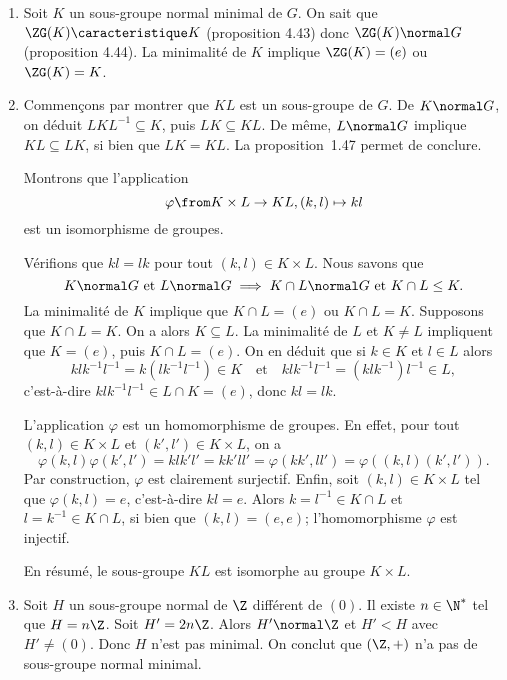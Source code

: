 \begin{enumerate}
  \item
    Soit $K$ un sous-groupe normal minimal de $G$. On sait que
    $\ZG(K)\caracteristique K$ (proposition 4.43) donc $\ZG(K)\normal G$
    (proposition 4.44).  La minimalité de $K$ implique $\ZG(K) = (e)$ ou
    $\ZG(K) = K$.

  \item
    Commençons par montrer que $KL$ est un sous-groupe de $G$.
    De $K\normal G$, on déduit $LKL^{-1}\subseteq K$, puis $LK\subseteq KL$.
    De même, $L\normal G$ implique $KL\subseteq LK$, si bien que $LK = KL$.
    La proposition~1.47 permet de conclure.

    Montrons que l'application
    \[
      \varphi\from K\times L\to KL,
      (k,l) \mapsto kl
    \]
    est un isomorphisme de groupes.

    Vérifions que $kl = lk$ pour tout $(k,l)\in K\times L$. Nous savons
    que
    \[
      K\normal G\text{ et } L\normal G
      \implies K\cap L\normal G\text{ et } K\cap L\leq K.
    \]
    La minimalité de $K$ implique que $K\cap L = (e)$ ou $K\cap L = K$.
    Supposons que $K\cap L = K$. On a alors $K\subseteq  L$.  La minimalité de
    $L$ et $K\neq L$ impliquent que $K = (e)$, puis $K\cap L = (e)$.  On en
    déduit que si $k\in K$ et $l\in L$ alors
    \[
      klk^{-1}l^{-1} = k(lk^{-1}l^{-1})\in K
      \quad\text{et}\quad
      klk^{-1}l^{-1} = (klk^{-1})l^{-1}\in L,
    \]
    c'est-à-dire $klk^{-1}l^{-1}\in L\cap K = (e)$, donc $kl = lk$.

    L'application $\varphi$ est un homomorphisme de groupes. En effet, pour
    tout $(k,l)\in K\times L$ et $(k',l')\in K\times L$, on a
    \[
      \varphi(k,l)\varphi(k',l')
      = klk'l'=kk'll'
      = \varphi(kk',ll')
      = \varphi((k,l)(k',l')).
    \]
    Par construction, $\varphi$ est clairement surjectif. Enfin, soit
    $(k,l)\in K\times L$ tel que $\varphi(k,l) = e$, c'est-à-dire $kl = e$.
    Alors $k = l^{-1}\in K\cap L$ et $l = k^{-1}\in K\cap L$, si bien que $(k,l) = (e,e)$;
    l'homomorphisme $\varphi$ est injectif.

    En résumé, le sous-groupe $KL$ est isomorphe au groupe $K\times L$.

  \item
    Soit $H$ un sous-groupe normal de $\Z$ différent de $(0)$.  Il existe
    $n\in\N^*$ tel que $H = n\Z$. Soit $H' = 2n\Z$. Alors $H'\normal \Z$ et
    $H'<H$ avec $H'\neq (0)$. Donc $H$ n'est pas minimal. On conclut que
    $(\Z,+)$ n'a pas de sous-groupe normal minimal.
\end{enumerate}

